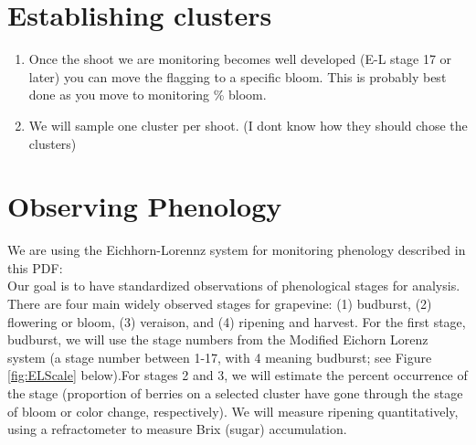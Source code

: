 \documentclass[11pt,letter]{article}
\begin{document}
\section{Establishing clusters}
\begin{enumerate}
	\item Once the shoot we are monitoring becomes well developed (E-L stage 17 or later) you can move the flagging to a specific bloom. This is probably best done as you move to monitoring \% bloom. 
	\item We will sample one cluster per shoot. 
	(I dont know how they should chose the clusters)

\end{enumerate}

\section{Observing Phenology}
We are using the Eichhorn-Lorennz system for monitoring phenology described in this PDF: \\

Our goal is to have standardized observations of phenological stages for analysis. There are four main widely observed stages for grapevine: (1) budburst, (2) flowering or bloom, (3) veraison, and (4) ripening and harvest. For the first stage, budburst, we will use the stage numbers from the Modified Eichorn Lorenz system (a stage number between 1-17, with 4 meaning budburst; see Figure \ref{fig:ELScale} below).For stages 2 and 3, we will estimate the percent occurrence of the stage (proportion of berries on a selected cluster have gone through the stage of bloom or color change, respectively). We will measure ripening quantitatively, using a refractometer to measure Brix (sugar) accumulation. 
\end{document}
